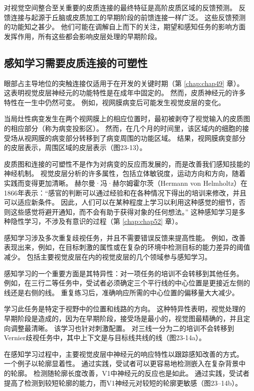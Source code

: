 对视觉空间整合至关重要的皮质连接的最终特征是高阶皮质区域的反馈预测。
反馈连接与起源于丘脑或皮质加工的早期阶段的前馈连接一样广泛。
这些反馈预测的功能知之甚少。
他们可能在调解自上而下的关注，期望和感知任务的影响方面发挥作用，所有这些都会影响皮层处理的早期阶段。



\subsection{感知学习需要皮质连接的可塑性}
眼部占主导地位的突触连接仅适用于在开发的关键时期（第 \ref{chap:chap49} 章）。
这表明视觉皮层神经元的功能特性是在成年中固定的。 
然而，皮质神经元的许多特性在一生中仍然可变。
例如，视网膜病变后可能发生视觉皮层的变化。


当局灶性病变发生在两个视网膜上的相应位置时，最初被剥夺了视觉输入的皮质图的相应部分（称为病变投影区）。
然而，在几个月的时间里，该区域内的细胞的接受场从视网膜的病变部分转移到了病变周围的功能区域。
结果，视网膜病变部分的皮层表示，周围区域的皮层表示（图23-13）。


皮质图和连接的可塑性不是作为对病变的反应而发展的，而是改善我们感知技能的神经机制。
视觉皮层分析的许多属性，包括立体敏锐度，运动方向和方向，随着实践而变得更加清晰。
赫尔曼·冯·赫尔姆霍尔茨（Hermann von Helmholtz）在1866年表示：“感官的判断可以通过经验和在各种情况下得出的培训来修改，并且可以适应新条件。
因此，人们可以在某种程度上学习以利用这种感觉的细节，否则这些感觉将避开通知，而不会有助于获得对象的任何想法。” 这种感知学习是多种隐性学习，不涉及有意识的过程（第 \ref{chap:chap52} 章）。


感知学习涉及多次重复歧视任务，并且不需要错误反馈来提高性能。
例如，改善表现出来，例如，在目标刺激的属性或在复杂的环境中检测目标的能力差异的阈值减少。
包括主要视觉皮层在内的视觉皮层的几个领域参与感知学习。


感知学习的一个重要方面是其特异性：对一项任务的培训不会转移到其他任务。
例如，在三行二等任务中，受试者必须确定三个平行线的中心位置是更接近左侧的线还是右侧的线。
重复练习后，准确响应所需的中心位置的偏移量大大减少。


学习此任务是特定于视野中的位置和线路的方向。
这种特异性表明，视觉处理的早期阶段是造成的，因为在早期阶段，接受场是最小的，视觉图最精确的，并且定向调整最清晰。
该学习也针对刺激配置。
对三线一分为二的培训不会转移到Vernier歧视任务中，其中上下文是与目标线共线的线（图23-14a）。


在感知学习过程中，主要视觉皮层中神经元的响应特性以跟踪感知改善的方式。
一个例子以轮廓显着性。
通过实践，受试者可以更容易地检测嵌入在复杂背景中的轮廓。
检测随轮廓长度改善，V1中神经元的反应也是如此。
通过实践，受试者提高了检测到较短轮廓的能力，而V1神经元对较短的轮廓更敏感（图23–14b）。



